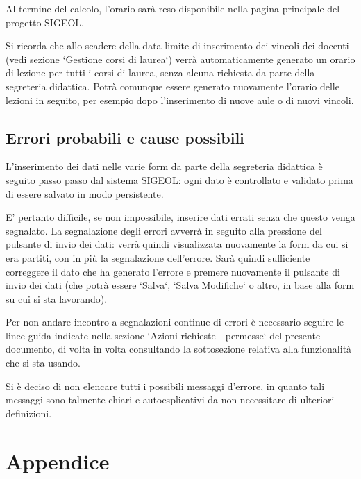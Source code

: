 \documentclass[11pt,a4paper]{article}
\begin{document}
Al termine del calcolo, l'orario sarà reso disponibile nella pagina principale del progetto SIGEOL.

Si ricorda che allo scadere della data limite di inserimento dei vincoli dei docenti (vedi sezione `Gestione corsi di laurea`) verrà automaticamente generato un orario di lezione per tutti i corsi di laurea, senza alcuna richiesta da parte della segreteria didattica. Potrà comunque essere generato nuovamente l'orario delle lezioni in seguito, per esempio dopo l'inserimento di nuove aule o di nuovi vincoli.
\subsection{Errori probabili e cause possibili}
L'inserimento dei dati nelle varie form da parte della segreteria didattica è seguito passo passo dal sistema SIGEOL: ogni dato è controllato e validato prima di essere salvato in modo persistente.

E' pertanto difficile, se non impossibile, inserire dati errati senza che questo venga segnalato.
La segnalazione degli errori avverrà in seguito alla pressione del pulsante di invio dei dati: verrà quindi visualizzata nuovamente la form da cui si era partiti, con in più la segnalazione dell'errore. Sarà quindi sufficiente correggere il dato che ha generato l'errore e premere nuovamente il pulsante di invio dei dati (che potrà essere `Salva`, `Salva Modifiche` o altro, in base alla form su cui si sta lavorando).

Per non andare incontro a segnalazioni continue di errori è necessario seguire le linee guida indicate nella sezione `Azioni richieste - permesse` del presente documento, di volta in volta consultando la sottosezione relativa alla funzionalità che si sta usando.

Si è deciso di non elencare tutti i possibili messaggi d'errore, in quanto tali messaggi sono talmente chiari e autoesplicativi da non necessitare di ulteriori definizioni.
\newpage
\section{Appendice}
\end{document}
